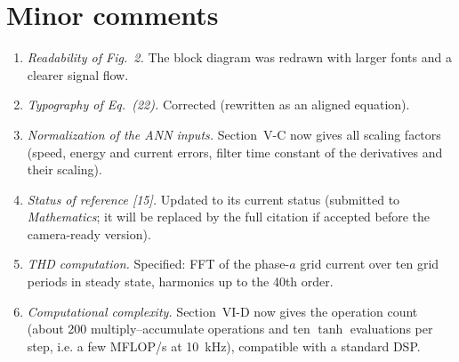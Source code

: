 \documentclass[11pt,a4paper]{article}
\begin{document}
\section*{Minor comments}
\begin{enumerate}[leftmargin=*]
\item \emph{Readability of Fig.~2.} The block diagram was redrawn with larger fonts and a clearer
signal flow.
\item \emph{Typography of Eq.~(22).} Corrected (rewritten as an aligned equation).
\item \emph{Normalization of the ANN inputs.} Section~V-C now gives all scaling factors (speed,
energy and current errors, filter time constant of the derivatives and their scaling).
\item \emph{Status of reference [15].} Updated to its current status (submitted to \emph{Mathematics}; it will be replaced by the full citation if accepted before the camera-ready version).
\item \emph{THD computation.} Specified: FFT of the phase-$a$ grid current over ten grid periods in
steady state, harmonics up to the 40th order.
\item \emph{Computational complexity.} Section~VI-D now gives the operation count (about 200
multiply--accumulate operations and ten $\tanh$ evaluations per step, i.e. a few MFLOP/s at 10~kHz),
compatible with a standard DSP.
\end{enumerate}
\end{document}
